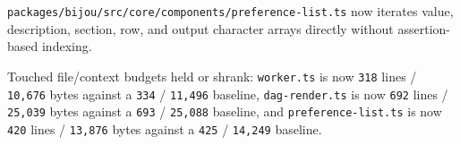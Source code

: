 \begin{itemize}
  \texttt{p\allowbreak{}a\allowbreak{}c\allowbreak{}k\allowbreak{}a\allowbreak{}g\allowbreak{}e\allowbreak{}s\allowbreak{}/\allowbreak{}b\allowbreak{}i\allowbreak{}j\allowbreak{}o\allowbreak{}u\allowbreak{}/\allowbreak{}s\allowbreak{}r\allowbreak{}c\allowbreak{}/\allowbreak{}c\allowbreak{}o\allowbreak{}r\allowbreak{}e\allowbreak{}/\allowbreak{}c\allowbreak{}o\allowbreak{}m\allowbreak{}p\allowbreak{}o\allowbreak{}n\allowbreak{}e\allowbreak{}n\allowbreak{}t\allowbreak{}s\allowbreak{}/\allowbreak{}p\allowbreak{}r\allowbreak{}e\allowbreak{}f\allowbreak{}e\allowbreak{}r\allowbreak{}e\allowbreak{}n\allowbreak{}c\allowbreak{}e\allowbreak{}-\allowbreak{}l\allowbreak{}i\allowbreak{}s\allowbreak{}t\allowbreak{}.\allowbreak{}t\allowbreak{}s} now iterates value, description, section, row, and output character arrays directly without assertion-based indexing.
\end{itemize}

Touched file/context budgets held or shrank: \texttt{w\allowbreak{}o\allowbreak{}r\allowbreak{}k\allowbreak{}e\allowbreak{}r\allowbreak{}.\allowbreak{}t\allowbreak{}s} is now \texttt{3\allowbreak{}1\allowbreak{}8} lines / \texttt{1\allowbreak{}0\allowbreak{},\allowbreak{}6\allowbreak{}7\allowbreak{}6} bytes against a \texttt{3\allowbreak{}3\allowbreak{}4} / \texttt{1\allowbreak{}1\allowbreak{},\allowbreak{}4\allowbreak{}9\allowbreak{}6} baseline, \texttt{d\allowbreak{}a\allowbreak{}g\allowbreak{}-\allowbreak{}r\allowbreak{}e\allowbreak{}n\allowbreak{}d\allowbreak{}e\allowbreak{}r\allowbreak{}.\allowbreak{}t\allowbreak{}s} is now \texttt{6\allowbreak{}9\allowbreak{}2} lines / \texttt{2\allowbreak{}5\allowbreak{},\allowbreak{}0\allowbreak{}3\allowbreak{}9} bytes against a \texttt{6\allowbreak{}9\allowbreak{}3} / \texttt{2\allowbreak{}5\allowbreak{},\allowbreak{}0\allowbreak{}8\allowbreak{}8} baseline, and \texttt{p\allowbreak{}r\allowbreak{}e\allowbreak{}f\allowbreak{}e\allowbreak{}r\allowbreak{}e\allowbreak{}n\allowbreak{}c\allowbreak{}e\allowbreak{}-\allowbreak{}l\allowbreak{}i\allowbreak{}s\allowbreak{}t\allowbreak{}.\allowbreak{}t\allowbreak{}s} is now \texttt{4\allowbreak{}2\allowbreak{}0} lines / \texttt{1\allowbreak{}3\allowbreak{},\allowbreak{}8\allowbreak{}7\allowbreak{}6} bytes against a \texttt{4\allowbreak{}2\allowbreak{}5} / \texttt{1\allowbreak{}4\allowbreak{},\allowbreak{}2\allowbreak{}4\allowbreak{}9} baseline.

